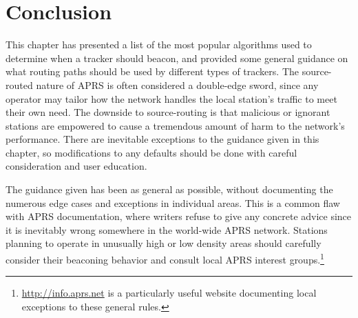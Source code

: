 \section{Conclusion}

This chapter has presented a list of the most popular algorithms
used to determine when a tracker should beacon, and provided some
general guidance on what routing paths should be used by different types
of trackers.
The source-routed nature of APRS is often considered a double-edge sword,
since any operator may tailor how the network
handles the local station's traffic to meet their own need.
The downside to source-routing is that malicious or ignorant stations
are empowered to cause a tremendous amount of harm to the network's performance.
There are inevitable exceptions to the guidance given in this chapter,
so modifications to any defaults should be done with careful consideration
and user education.

The guidance given has been as general as possible,
without documenting the numerous edge cases and exceptions in individual areas.
This is a common flaw with APRS documentation,
where writers refuse to give any concrete advice since it is inevitably wrong
somewhere in the world-wide APRS network.
Stations planning to operate in unusually high or low density areas should
carefully consider their beaconing behavior and consult local APRS interest
groups.\footnote{\url{http://info.aprs.net} is a particularly useful website
documenting local exceptions to these general rules.}
